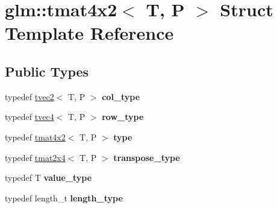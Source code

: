 \hypertarget{structglm_1_1tmat4x2}{}\section{glm\+:\+:tmat4x2$<$ T, P $>$ Struct Template Reference}
\label{structglm_1_1tmat4x2}
\subsection*{Public Types}
\begin{DoxyCompactItemize}
\item 
\mbox{\label{structglm_1_1tmat4x2_ac775231a890f4ea29cd0073670309b3a}} 
typedef \hyperlink{structglm_1_1tvec2}{tvec2}$<$ T, P $>$ {\bfseries col\+\_\+type}
\item 
\mbox{\label{structglm_1_1tmat4x2_a3bef891d2ec9d87bc5ada0602ad3122f}} 
typedef \hyperlink{structglm_1_1tvec4}{tvec4}$<$ T, P $>$ {\bfseries row\+\_\+type}
\item 
\mbox{\label{structglm_1_1tmat4x2_a92c6e11d269f4f72087d8152689f16f1}} 
typedef \hyperlink{structglm_1_1tmat4x2}{tmat4x2}$<$ T, P $>$ {\bfseries type}
\item 
\mbox{\label{structglm_1_1tmat4x2_a5eede582c47564806cff64584a24726c}} 
typedef \hyperlink{structglm_1_1tmat2x4}{tmat2x4}$<$ T, P $>$ {\bfseries transpose\+\_\+type}
\item 
\mbox{\label{structglm_1_1tmat4x2_a1a84490287435bbc6746b250e03169f5}} 
typedef T {\bfseries value\+\_\+type}
\item 
\mbox{\label{structglm_1_1tmat4x2_a28aaf36ee36edef6715c1fae6874f530}} 
typedef length\+\_\+t {\bfseries length\+\_\+type}
\end{DoxyCompactItemize}
